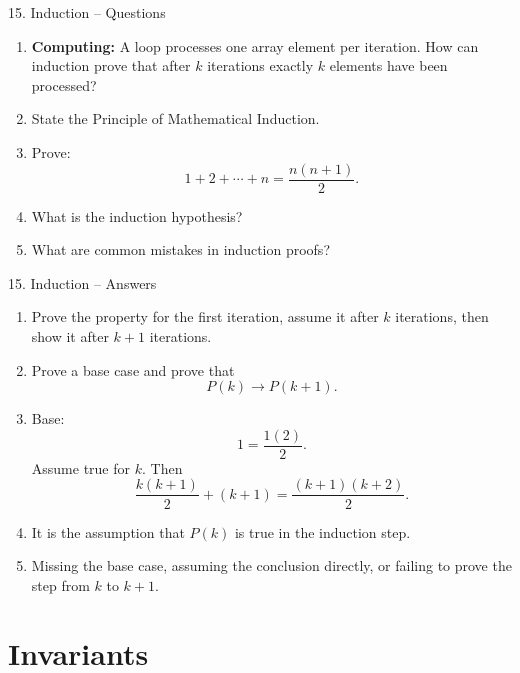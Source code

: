 \documentclass[aspectratio=169,11pt]{beamer}
\begin{document}
\begin{frame}{15. Induction -- Questions}

\begin{enumerate}
\item \textbf{Computing:} A loop processes one array element per iteration. How can induction prove that after $k$ iterations exactly $k$ elements have been processed?

\item State the Principle of Mathematical Induction.

\item Prove:
\[
1+2+\cdots+n=\frac{n(n+1)}2.
\]

\item What is the induction hypothesis?

\item What are common mistakes in induction proofs?
\end{enumerate}

\end{frame}

\begin{frame}{15. Induction -- Answers}

\begin{enumerate}
\item Prove the property for the first iteration, assume it after $k$ iterations, then show it after $k+1$ iterations.

\item Prove a base case and prove that
\[
P(k)\to P(k+1).
\]

\item Base:
\[
1=\frac{1(2)}2.
\]
Assume true for $k$. Then
\[
\frac{k(k+1)}2+(k+1)
=
\frac{(k+1)(k+2)}2.
\]

\item It is the assumption that $P(k)$ is true in the induction step.

\item Missing the base case, assuming the conclusion directly, or failing to prove the step from $k$ to $k+1$.
\end{enumerate}

\end{frame}


\section{Invariants}
\end{document}
